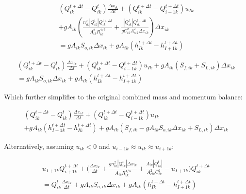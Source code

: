 \documentclass[11pt]{article}
\begin{document}
\begin{equation}
  \begin{split}
    (Q_{ik}^{t + \Delta t} - Q_{ik}^t) \frac{\Delta x_{ik}}{\Delta t} + (Q_{ik}^{t + \Delta t} - Q_{i - 1k}^{t + \Delta t}) u_{Ik} \\ + g A_{ik} (\frac{n_{ik}^2 |Q_{ik}^t| Q_{ik}^{t + \Delta t}}{A_{ik}^2 R_{ik}^{4/3}} + \frac{|Q_{ik}^t| Q_{ik}^{t + \Delta t}}{g C_{ik}^2 A_{cik}^2 \Delta x_{ik}}) \Delta x_{ik} \\ =
    g A_{ik} S_{o,ik} \Delta x_{ik} + g A_{ik} (h_{Ik}^{t + \Delta t} - h_{I+1k}^{t + \Delta t})
  \end{split}
\end{equation}


\begin{equation}
  \begin{split}
    (Q_{ik}^{t + \Delta t} - Q_{ik}^t) \frac{\Delta x_{ik}}{\Delta t} + (Q_{ik}^{t + \Delta t} - Q_{i - 1k}^{t + \Delta t}) u_{Ik} + g A_{ik} (S_{f,ik} + S_{L,ik}) \Delta x_{ik} \\ =
    g A_{ik} S_{o,ik} \Delta x_{ik} + g A_{ik} (h_{Ik}^{t + \Delta t} - h_{I+1k}^{t + \Delta t})
  \end{split}
\end{equation}

Which further simplifies to the original combined mass and momentum balance:

\begin{equation}
  \begin{split}
    (Q_{ik}^{t + \Delta t} - Q_{ik}^t) \frac{\Delta x_{ik}}{\Delta t} + (Q_{ik}^{t + \Delta t} - Q_{i - 1k}^{t + \Delta t}) u_{Ik} \\ + g A_{ik} (h_{I+1k}^{t + \Delta t} - h_{Ik}^{t + \Delta t}) + g A_{ik} (S_{f,ik} -
    g A_{ik} S_{o,ik} \Delta x_{ik} + S_{L,ik}) \Delta x_{ik}
  \end{split}
\end{equation}

Alternatively, assuming $u_{ik} < 0$ and $u_{i-1k} \approx u_{ik} \approx u_{i+1k}$:

\begin{equation}
  \begin{split}
    u_{I+1k} Q_{i+1k}^{t + \Delta t} + \biggl(\frac{\Delta x_{ik}}{\Delta t} + \frac{g n_{ik}^2 |Q_{ik}^t| \Delta x_{ik}}{A_{ik} R_{ik}^{4/3}} + \frac{A_{ik} |Q_{ik}^t|}{A_{cik}^2 C_{ik}^2} - u_{I+1k} \biggr) Q_{ik}^{t + \Delta t} \\ =
    Q_{ik}^t \frac{\Delta x_{ik}}{\Delta t} + g A_{ik} S_{o,ik} \Delta x_{ik} + g A_{ik} (h_{Ik}^{t + \Delta t} - h_{I+1k}^{t + \Delta t})
  \end{split}
\end{equation}
\end{document}
